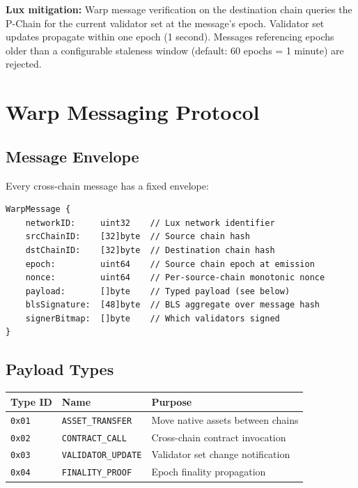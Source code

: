 \documentclass[11pt,a4paper]{article}
\begin{document}
\textbf{Lux mitigation:} Warp message verification on the destination chain queries the P-Chain for the current validator set at the message's epoch. Validator set updates propagate within one epoch (1 second). Messages referencing epochs older than a configurable staleness window (default: 60 epochs = 1 minute) are rejected.

\section{Warp Messaging Protocol}

\subsection{Message Envelope}

Every cross-chain message has a fixed envelope:

\begin{verbatim}
WarpMessage {
    networkID:     uint32    // Lux network identifier
    srcChainID:    [32]byte  // Source chain hash
    dstChainID:    [32]byte  // Destination chain hash
    epoch:         uint64    // Source chain epoch at emission
    nonce:         uint64    // Per-source-chain monotonic nonce
    payload:       []byte    // Typed payload (see below)
    blsSignature:  [48]byte  // BLS aggregate over message hash
    signerBitmap:  []byte    // Which validators signed
}
\end{verbatim}

\subsection{Payload Types}

\begin{center}
\begin{tabular}{lll}
\toprule
\textbf{Type ID} & \textbf{Name} & \textbf{Purpose} \\
\midrule
\texttt{0x01} & \texttt{ASSET\_TRANSFER} & Move native assets between chains \\
\texttt{0x02} & \texttt{CONTRACT\_CALL} & Cross-chain contract invocation \\
\texttt{0x03} & \texttt{VALIDATOR\_UPDATE} & Validator set change notification \\
\texttt{0x04} & \texttt{FINALITY\_PROOF} & Epoch finality propagation \\
\bottomrule
\end{tabular}
\end{center}
\end{document}
